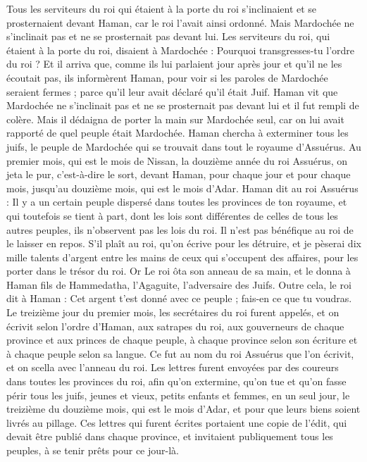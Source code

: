 \begin{multicols}{2}
Tous les serviteurs du roi qui étaient à la porte du roi s'inclinaient et se prosternaient devant Haman, car le roi l’avait ainsi ordonné. Mais Mardochée ne s'inclinait pas et ne se prosternait pas devant lui.
Les serviteurs du roi, qui étaient à la porte du roi, disaient à Mardochée : Pourquoi transgresses-tu l’ordre du roi ?
Et il arriva que, comme ils lui parlaient jour après jour et qu’il ne les écoutait pas, ils informèrent Haman, pour voir si les paroles de Mardochée seraient fermes ; parce qu’il leur avait déclaré qu’il était Juif.
Haman vit que Mardochée ne s'inclinait pas et ne se prosternait pas devant lui et il fut rempli de colère.
Mais il dédaigna de porter la main sur Mardochée seul, car on lui avait rapporté de quel peuple était Mardochée. Haman chercha à exterminer tous les juifs, le peuple de Mardochée qui se trouvait dans tout le royaume d'Assuérus.
Au premier mois, qui est le mois de Nissan, la douzième année du roi Assuérus, on jeta le pur, c'est-à-dire le sort, devant Haman, pour chaque jour et pour chaque mois, jusqu’au douzième mois, qui est le mois d'Adar.
Haman dit au roi Assuérus : Il y a un certain peuple dispersé dans toutes les provinces de ton royaume, et qui toutefois se tient à part, dont les lois sont différentes de celles de tous les autres peuples, ils n’observent pas les lois du roi. Il n'est pas bénéfique au roi de le laisser en repos.
S'il plaît au roi, qu'on écrive pour les détruire, et je pèserai dix mille talents d'argent entre les mains de ceux qui s’occupent des affaires, pour les porter dans le trésor du roi.
Or Le roi ôta son anneau de sa main, et le donna à Haman fils de Hammedatha, l’Agaguite, l’adversaire des Juifs.
Outre cela, le roi dit à Haman : Cet argent t'est donné avec ce peuple ; fais-en ce que tu voudras.
Le treizième jour du premier mois, les secrétaires du roi furent appelés, et on écrivit selon l’ordre d'Haman, aux satrapes du roi, aux gouverneurs de chaque province et aux princes de chaque peuple, à chaque province selon son écriture et à chaque peuple selon sa langue. Ce fut au nom du roi Assuérus que l’on écrivit, et on scella avec l'anneau du roi.
Les lettres furent envoyées par des coureurs dans toutes les provinces du roi, afin qu'on extermine, qu’on tue et qu’on fasse périr tous les juifs, jeunes et vieux, petits enfants et femmes, en un seul jour, le treizième du douzième mois, qui est le mois d'Adar, et pour que leurs biens soient livrés au pillage.
Ces lettres qui furent écrites portaient une copie de l’édit, qui devait être publié dans chaque province, et invitaient publiquement tous les peuples, à se tenir prêts pour ce jour-là.

\end{multicols}
